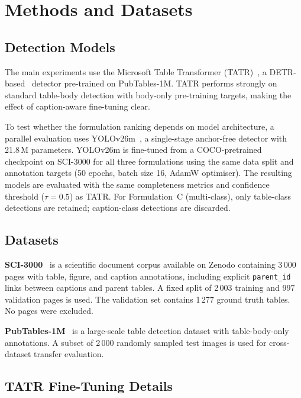 \documentclass[pdflatex,sn-mathphys-num,iicol]{sn-jnl}
\begin{document}
\section{Methods and Datasets}\label{sec:methods}

\subsection{Detection Models}\label{sec:models}

The main experiments use the Microsoft Table Transformer
(TATR)~\cite{smock2022pubtables}, a DETR-based~\cite{carion2020detr} detector
pre-trained on PubTables-1M. TATR performs strongly on standard table-body detection
with body-only pre-training targets, making the effect of caption-aware fine-tuning
clear.

To test whether the formulation ranking depends on model architecture, a parallel
evaluation uses YOLOv26m~\cite{ultralytics2025yolo}, a single-stage anchor-free
detector with 21.8\,M parameters. YOLOv26m is fine-tuned from a COCO-pretrained
checkpoint on SCI-3000 for all three formulations using the same data split and
annotation targets (50 epochs, batch size 16, AdamW optimiser). The resulting models are evaluated with the same
completeness metrics and confidence threshold ($\tau = 0.5$) as TATR. For
Formulation~C (multi-class), only table-class detections are retained; caption-class
detections are discarded.

\subsection{Datasets}\label{sec:datasets}

\textbf{SCI-3000}~\cite{darmanovic2023sci} is a scientific document corpus available
on Zenodo containing 3\,000 pages with table, figure, and caption annotations,
including explicit \texttt{parent\_id} links between captions and parent tables. A
fixed split of 2\,003 training and 997 validation pages is used. The validation set
contains 1\,277 ground truth tables. No pages were excluded.

\textbf{PubTables-1M}~\cite{smock2022pubtables} is a large-scale table detection
dataset with table-body-only annotations. A subset of 2\,000 randomly sampled test
images is used for cross-dataset transfer evaluation.

\subsection{TATR Fine-Tuning Details}\label{sec:finetuning}
\end{document}
